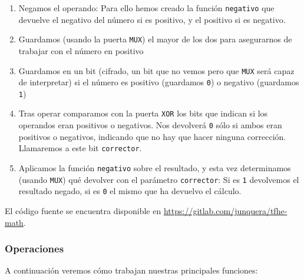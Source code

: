 \begin{enumerate}
  \begin{enumerate}
    \item Negamos el operando: Para ello hemos creado la función \texttt{negativo} que devuelve el negativo del número si es positivo, y el positivo si es negativo.
    \item Guardamos (usando la puerta \texttt{MUX}) el mayor de los dos para asegurarnos de trabajar con el número en positivo
    \item Guardamos en un bit (cifrado, un bit que no vemos pero que \texttt{MUX} será capaz de interpretar) si el número es positivo (guardamos \texttt{0}) o negativo (guardamos \texttt{1})
    \item Tras operar comparamos con la puerta \texttt{XOR} los bits que indican si los operandos eran positivos o negativos. Nos devolverá \texttt{0} sólo si ambos eran positivos o negativos, indicando que no hay que hacer ninguna corrección. Llamaremos a este bit \texttt{corrector}.
    \item Aplicamos la función \texttt{negativo} sobre el resultado, y esta vez determinamos (usando \texttt{MUX}) qué devolver con el parámetro \texttt{corrector}: Si es \texttt{1} devolvemos el resultado negado, si es \texttt{0} el mismo que ha devuelvo el cálculo.
  \end{enumerate}

\end{enumerate}

El código fuente se encuentra disponible en \url{https://gitlab.com/junquera/tfhe-math}.

\subsubsection{Operaciones}
\label{tag:tfhe-math-ops}

A continuación veremos cómo trabajan nuestras principales funciones:

